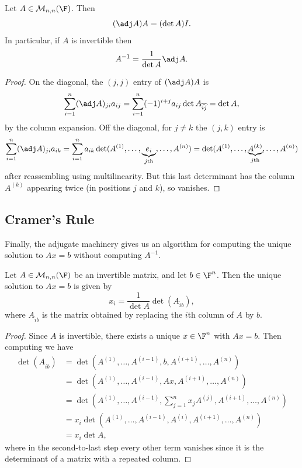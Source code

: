 \begin{theorem}
    Let $A \in \mathcal{M}_{n,n}(\F)$. Then
    $$
    (\adj A) A = (\det A) I.
    $$
    In particular, if $A$ is invertible then
    $$
    A^{-1} = \frac{1}{\det A} \adj A.
    $$
\end{theorem}
\begin{proof}
    On the diagonal, the $(j, j)$ entry of $(\adj A)A$ is
    $$
    \sum_{i = 1}^n (\adj A)_{ji} a_{ij} = \sum_{i = 1}^n (-1)^{i + j} a_{ij}\det A_{\widehat{i}\widehat{j}} = \det A,
    $$
    by the column expansion. Off the diagonal, for $j \neq k$ the $(j, k)$ entry is
    $$
    \sum_{i = 1}^n (\adj A)_{ji} a_{ik} = \sum_{i = 1}^n a_{ik} \det (A^{(1)}, \dots, \underbrace{e_i}_{j\text{th}}, \dots, A^{(n)}) = \det(A^{(1)}, \dots, \underbrace{A^{(k)}}_{j\text{th}}, \dots, A^{(n)})
    $$
    after reassembling using multilinearity. But this last determinant has the column $A^{(k)}$ appearing twice (in positions $j$ and $k$), so vanishes.
\end{proof}

\subsection{Cramer's Rule}

Finally, the adjugate machinery gives us an algorithm for computing the unique solution to $Ax = b$ without computing $A^{-1}$.

\begin{proposition}
    Let $A \in \mathcal{M}_{n , n}(\F)$ be an invertible matrix, and let $b \in \F^n$. Then the unique solution to $Ax = b$ is given by
    $$
    x_i = \frac{1}{\det A} \det(A_{\widehat{i}b}),
    $$
    where $A_{\widehat{i}b}$ is the matrix obtained by replacing the $i$th column of $A$ by $b$.
\end{proposition}
\begin{proof}
    Since $A$ is invertible, there exists a unique $x \in \F^n$ with $Ax = b$. Then
    computing we have
    \begin{align*}
        \det(A_{\widehat{i}b}) &= \det(A^{(1)}, \dots, A^{(i - 1)}, b, A^{(i + 1)}, \dots, A^{(n)}) \\
        &= \det(A^{(1)}, \dots, A^{(i - 1)}, Ax, A^{(i + 1)}, \dots, A^{(n)}) \\
        &= \det\left(A^{(1)}, \dots, A^{(i - 1)}, \sum_{j = 1}^n x_j A^{(j)}, A^{(i + 1)}, \dots, A^{(n)}\right) \\
        &= x_i \det(A^{(1)}, \dots, A^{(i - 1)}, A^{(i)}, A^{(i + 1)}, \dots, A^{(n)})  \\
        &= x_i \det A,
    \end{align*}
    where in the second-to-last step every other term vanishes since it is the determinant of a matrix with a repeated column.
\end{proof}

